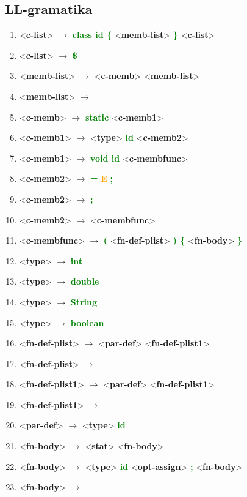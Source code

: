 \documentclass[a4paper, 11pt]{article}
\providecommand{\nonterm}[1]{\textless \textbf{#1}\textgreater}
\providecommand{\term}[1]{\textcolor{Green}{\textbf{#1}}}
\providecommand{\arrow}{ $\rightarrow$ }
\providecommand{\E}{ \textcolor{Orange}{\textbf{E}}}
\providecommand{\eps}{ \textcolor{Red}{\textbf{\textepsilon}}}
\begin{document}
    \subsection{LL-gramatika}
    \begin{enumerate}[itemsep=0mm]
        \item\nonterm{c-list}\arrow\term{class id \{ }\nonterm{memb-list}\term{ \}}       \nonterm{c-list}
        \item\nonterm{c-list}\arrow\term{\$}
        \item\nonterm{memb-list}\arrow\nonterm{c-memb} \nonterm{memb-list}
        \item\nonterm{memb-list}\arrow \eps
        \item\nonterm{c-memb}\arrow\term{static} \nonterm{c-memb1}
        \item\nonterm{c-memb1}\arrow\nonterm{type} \term{id} \nonterm{c-memb2}
        \item\nonterm{c-memb1}\arrow\term{void id} \nonterm{c-membfunc}
        \item\nonterm{c-memb2}\arrow\term{= }\E\term{ ;}
        \item\nonterm{c-memb2}\arrow\term{;}
        \item\nonterm{c-memb2}\arrow\nonterm{c-membfunc}
        \item\nonterm{c-membfunc}\arrow\term{(} \nonterm{fn-def-plist} \term{) \{} \nonterm{fn-body} \term{\}}
        \item\nonterm{type}\arrow\term{int}
        \item\nonterm{type}\arrow\term{double}
        \item\nonterm{type}\arrow\term{String}
        \item\nonterm{type}\arrow\term{boolean}
        \item\nonterm{fn-def-plist}\arrow\nonterm{par-def} \nonterm{fn-def-plist1}
        \item\nonterm{fn-def-plist}\arrow\eps
        \item\nonterm{fn-def-plist1}\arrow\nonterm{par-def} \nonterm{fn-def-plist1}
        \item\nonterm{fn-def-plist1}\arrow\eps
        \item\nonterm{par-def}\arrow\nonterm{type} \term{id}
        \item\nonterm{fn-body}\arrow\nonterm{stat} \nonterm{fn-body}
        \item\nonterm{fn-body}\arrow\nonterm{type} \term{id} \nonterm{opt-assign} \term{;} \nonterm{fn-body}
        \item\nonterm{fn-body}\arrow\eps

\end{enumerate}
\end{document}
